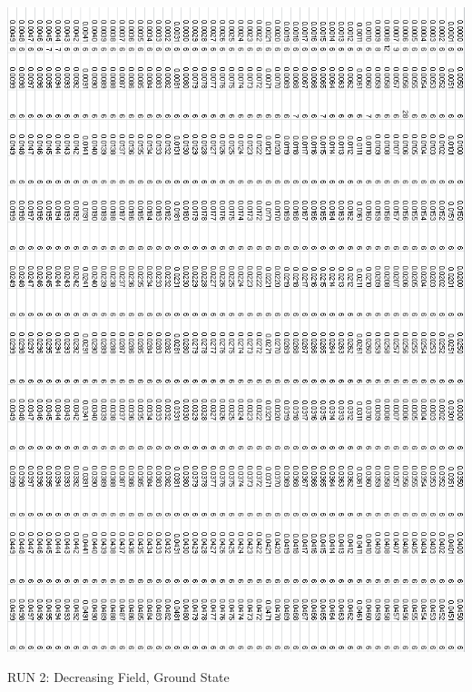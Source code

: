 \documentclass{article}
\begin{document}
\begin{center}
 \includegraphics[keepaspectratio,scale=0.58]{000to005SpinChart.png}
\end{center}
\pagebreak
\thispagestyle{plain}
\begin{center}
\LARGE
RUN 2: Decreasing Field, Ground State
\end{center}
\end{document}
